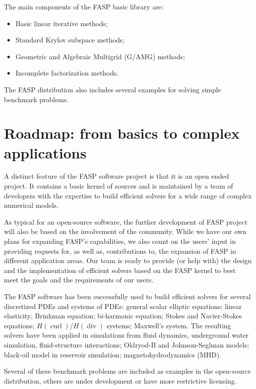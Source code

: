 \documentclass[11pt]{memoir}
\begin{document}
The main components of the FASP basic library are:
\begin{itemize}\setlength{\itemsep}{-1mm}
\item Basic linear iterative methods;
\item Standard Krylov subspace methods;
\item Geometric and Algebraic Multigrid (G/AMG) methods;
\item Incomplete factorization methods.
\end{itemize}
The FASP distribution also includes several examples for solving
simple benchmark problems.

\section{Roadmap: from basics to complex applications} 
A distinct feature of the FASP software project is that it is an open
ended project. It contains a basic kernel of sources and is maintained
by a team of developers with the expertise to build efficient solvers
for a wide range of complex numerical models.

As typical for an open-source software, the further development of
FASP project will also be based on the involvement of the community.
While we have our own plans for expanding FASP's capabilities, we also
count on the users' input in providing requests for, as well as,
contributions to, the expansion of FASP in different application
areas. Our team is ready to provide (or help with) the design and the
implementation of efficient solvers based on the FASP kernel to best
meet the goals and the requirements of our users.

The FASP software has been successfully used to build efficient
solvers for several discretized PDEs and systems of PDEs: 
general scalar elliptic equations; linear elasticity;
Brinkman equation; bi-harmonic equation; Stokes and Navier-Stokes
equations; $H(\operatorname{curl})/H(\operatorname{div})$ systems;
Maxwell's system. The resulting solvers have been applied in simulations from 
fluid dynamics, underground water simulation, fluid-structure
interactions; Oldryod-B and Johnson-Seglman models; black-oil model
in reservoir simulation; magnetohydrodynamics (MHD).

Several of these benchmark problems are included as examples in
the open-source distribution, others are under development or have
more restrictive licensing.

%

\end{document}
